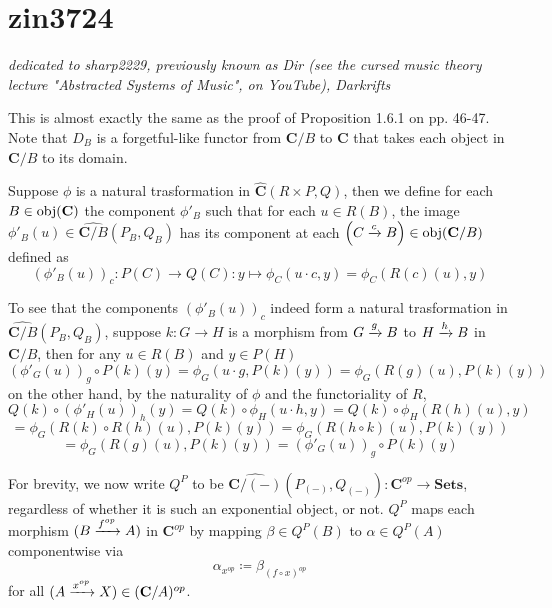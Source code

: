 \section{zin3724}
\emph{dedicated to sharp2229, previously known as Dir (see the cursed music theory lecture "Abstracted Systems of Music", on YouTube), Darkrifts}

This is almost exactly the same as the proof of Proposition 1.6.1 on pp. 46-47. Note that $D_B$ is a forgetful-like functor from $\mathbf C/B$ to $\mathbf C$ that takes each object in $\mathbf C/B$ to its domain.

Suppose $\phi$ is a natural trasformation in $\widehat{\mathbf{C}}(R\times P,Q)$, then we define for each $B\in\operatorname{\operatorname{obj}}(\mathbf C)$ the component $\phi'_B$ such that for each $u\in R(B)$, the image $\phi'_B(u)\in\widehat{\mathbf{C}/B}(P_B,Q_B)$ has its component at each $\left(C\xrightarrow{c}B\right)\in\operatorname{\operatorname{obj}}(\mathbf C/B)$ defined as
\[(\phi'_B(u))_c:P(C)\to Q(C):y\mapsto\phi_C(u\cdot c,y)=\phi_C(R(c)(u),y)\]

To see that the components $(\phi'_B(u))_c$ indeed form a natural trasformation in $\widehat{\mathbf{C}/B}(P_B,Q_B)$, suppose $k:G\to H$ is a morphism from $G\xrightarrow{g}B$ to $H\xrightarrow{h}B$ in $\mathbf{C}/B$, then for any $u\in R(B)$ and $y\in P(H)$
\[(\phi'_G(u))_g\circ P(k)(y)=\phi_G(u\cdot g,P(k)(y))=\phi_G(R(g)(u),P(k)(y))\]
on the other hand, by the naturality of $\phi$ and the functoriality of $R$,
\[Q(k)\circ(\phi'_H(u))_h(y)=Q(k)\circ\phi_H(u\cdot h,y)=Q(k)\circ\phi_H(R(h)(u),y)\]
\[=\phi_G(R(k)\circ R(h)(u),P(k)(y))=\phi_G(R(h\circ k)(u),P(k)(y))\]
\[=\phi_G(R(g)(u),P(k)(y))=(\phi'_G(u))_g\circ P(k)(y)\]

For brevity, we now write $Q^P$ to be $\widehat{\mathbf{C}/(-)}(P_{(-)},Q_{(-)}):\mathbf{C}^{op}\to\mathbf{Sets}$, regardless of whether it is such an exponential object, or not. $Q^P$ maps each morphism $(B\xrightarrow{f^{op}}A)$ in $\mathbf{C}^{op}$ by mapping $\beta\in Q^P(B)$ to $\alpha\in Q^P(A)$ componentwise via
\[\alpha_{x^{op}}\coloneqq\beta_{(f\circ x)^{op}}\]
for all $(A\xrightarrow{x^{op}}X)\in(\mathbf{C}/A)^{op}$.

